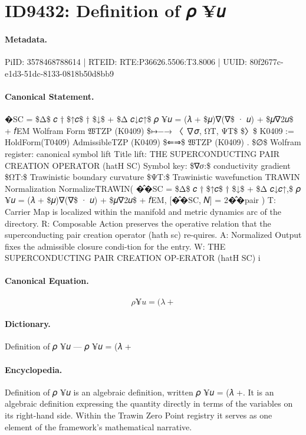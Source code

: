 \section*{ID9432: Definition of 𝜌 ¥𝑢}
\paragraph{Metadata.}
PiID: 3578468788614 | RTEID: RTE:P36626.5506:T3.8006 | UUID: 80f2677c-e1d3-51dc-8133-0818b50d8bb9

\paragraph{Canonical Statement.}
�SC = \$Δ\$ 𝑐 † \$↑𝑐\$ † \$↓\$ + \$Δ 𝑐↓𝑐↑\$ 𝜌 ¥𝑢 = (𝜆 + \$𝜇)∇(∇\$ · 𝑢) + \$𝜇∇2𝑢\$ + 𝑓EM Wolfram Form 𝔚TZP (K0409) \$↦−→ 〈 ∇𝜎, ΩT, ΨT\$ \$〉\$ K0409 := HoldForm(T0409) AdmissibleTZP (K0409) \$⇐⇒\$ 𝔚TZP (K0409) . \$∅\$ Wolfram register: canonical symbol lift Title lift: THE SUPERCONDUCTING PAIR CREATION OPERATOR (hatH SC) Symbol key: \$∇𝜎:\$ conductivity gradient \$ΩT:\$ Trawinistic boundary curvature \$ΨT:\$ Trawinistic wavefunction TRAWIN Normalization NormalizeTRAWIN( �̂�SC = \$Δ\$ 𝑐 † \$↑𝑐\$ † \$↓\$ + \$Δ 𝑐↓𝑐↑,\$ 𝜌 ¥𝑢 = (𝜆 + \$𝜇)∇(∇\$ · 𝑢) + \$𝜇∇2𝑢\$ + 𝑓EM, [�̂�SC, 𝑁] = 2�̂�pair ) T: Carrier Map is localized within the manifold and metric dynamics arc of the directory. R: Composable Action preserves the operative relation that the superconducting pair creation operator (hath sc) re-quires. A: Normalized Output fixes the admissible closure condi-tion for the entry. W: THE SUPERCONDUCTING PAIR CREATION OP-ERATOR (hatH SC) i

\paragraph{Canonical Equation.}
\[
𝜌 ¥𝑢 = (𝜆 +
\]

\paragraph{Dictionary.}
Definition of 𝜌 ¥𝑢 — 𝜌 ¥𝑢 = (𝜆 +

\paragraph{Encyclopedia.}
Definition of 𝜌 ¥𝑢 is an algebraic definition, written 𝜌 ¥𝑢 = (𝜆 +. It is an algebraic definition expressing the quantity directly in terms of the variables on its right-hand side. Within the Trawin Zero Point registry it serves as one element of the framework's mathematical narrative.
